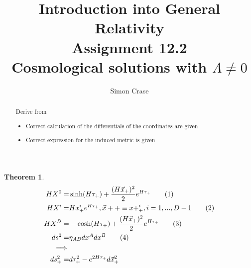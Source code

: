 \documentclass[]{article}
\title{Introduction into General Relativity\\Assignment 12.2\\Cosmological solutions with $\Lambda\ne 0$}
\author{Simon Crase}
\newtheorem{theorem}{Theorem}
\newcommand\numberthis{\addtocounter{equation}{1}\tag{\theequation}}
\begin{document}
\maketitle

\begin{abstract}
	Derive \cite[XII,(332)]{Akhmedov2017} from \cite[XII,(333)]{Akhmedov2017}
	\begin{itemize}
		\item     Correct calculation of the differentials of the coordinates are given
		\item Correct expression for the induced metric is given
	\end{itemize}
\end{abstract}

\begin{theorem}
	\begin{align*}
	HX^0=&\sinh(H\tau_+)+\frac{(H\vec{x}_+)^2}{2}e^{H\tau_+}\numberthis\label{eq:x0}\\
	HX^i=&Hx^i_+e^{H\tau_+}, \vec{x}++\equiv x+^i_+, i=1,...,D-1\numberthis\label{eq:xi}\\
	HX^D=&-\cosh(H\tau_+)+\frac{(H\vec{x}_+)^2}{2}e^{H\tau_+}\numberthis\label{eq:xD}\\
	ds^2=&\eta_{AB}dx^Adx^B\numberthis\label{eq:ds}\\
	\implies&\\
	ds^2_+=&d\tau^2_+ - e^{2H\tau_+}d\vec{x}^2_+	
	\end{align*}
\end{theorem}
\end{document}
